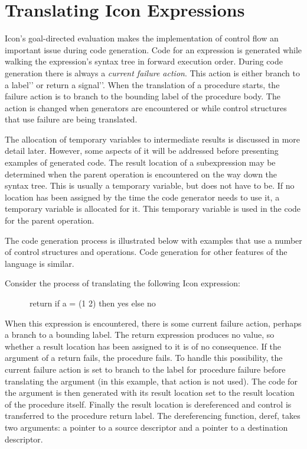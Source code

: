 \section{Translating Icon Expressions}

Icon's goal-directed evaluation makes the implementation of control
flow an important issue during code generation. Code for an expression
is generated while walking the expression's syntax tree in forward
execution order. During code generation there is always a
\textit{current failure action}. This action is either
{\textasciigrave}{\textasciigrave}branch to a label'{}' or
{\textasciigrave}{\textasciigrave}return a signal'{}'. When the
translation of a procedure starts, the failure action is to branch to
the bounding label of the procedure body. The action is changed when
generators are encountered or while control structures that use
failure are being translated.

The allocation of temporary variables to intermediate results is
discussed in more detail later. However, some aspects of it will be
addressed before presenting examples of generated code. The result
location of a subexpression may be determined when the parent
operation is encountered on the way down the syntax tree. This is
usually a temporary variable, but does not have to be. If no location
has been assigned by the time the code generator needs to use it, a
temporary variable is allocated for it. This temporary variable is
used in the code for the parent operation.

The code generation process is illustrated below with examples that
use a number of control structures and operations.  Code generation
for other features of the language is similar.

Consider the process of translating the following Icon expression: 

{\ttfamily\mdseries
\ \ \ \ \ \ return if a = (1 {\textbar} 2) then {\textquotedbl}yes{\textquotedbl} else {\textquotedbl}no{\textquotedbl}}

When this expression is encountered, there is some current failure
action, perhaps a branch to a bounding label. The return expression
produces no value, so whether a result location has been assigned to
it is of no consequence. If the argument of a return fails, the
procedure fails. To handle this possibility, the current failure
action is set to branch to the label for procedure failure before
translating the argument (in this example, that action is not used).
The code for the argument is then generated with its result location
set to the result location of the procedure itself. Finally the result
location is dereferenced and control is transferred to the procedure
return label. The dereferencing function, deref, takes two arguments:
a pointer to a source descriptor and a pointer to a destination
descriptor.

